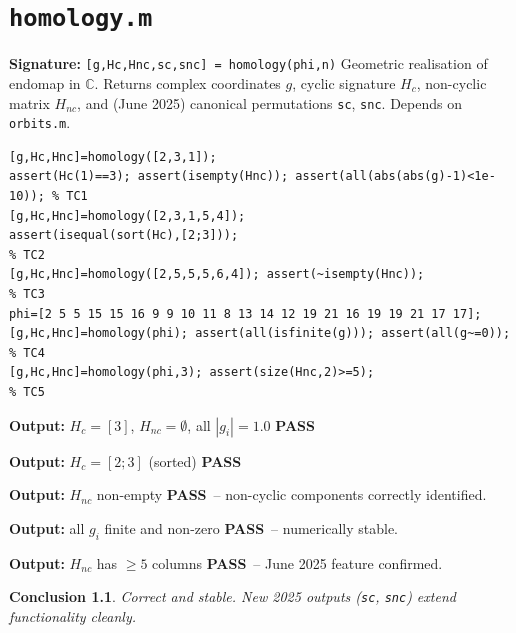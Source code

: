 \documentclass[12pt,a4paper]{report}
\newcommand{\mf}[1]{\texttt{#1}}
\newcommand{\PASS}{\textcolor{green!60!black}{\textbf{PASS}}}
\newtheorem{concl}{Conclusion}[chapter]
\begin{document}
\chapter{\mf{homology.m}}
\begin{tcolorbox}[Abox,title=Analysis]
\textbf{Signature:} \lstinline|[g,Hc,Hnc,sc,snc] = homology(phi,n)|\quad
Geometric realisation of endomap in $\mathbb{C}$. Returns complex coordinates $g$, cyclic signature $H_c$, non-cyclic matrix $H_{nc}$, and (June 2025) canonical permutations \mf{sc}, \mf{snc}. Depends on \mf{orbits.m}.
\end{tcolorbox}
\begin{lstlisting}[caption={Tests for homology.m}]
[g,Hc,Hnc]=homology([2,3,1]);
assert(Hc(1)==3); assert(isempty(Hnc)); assert(all(abs(abs(g)-1)<1e-10)); % TC1
[g,Hc,Hnc]=homology([2,3,1,5,4]);
assert(isequal(sort(Hc),[2;3]));                                           % TC2
[g,Hc,Hnc]=homology([2,5,5,5,6,4]); assert(~isempty(Hnc));               % TC3
phi=[2 5 5 15 15 16 9 9 10 11 8 13 14 12 19 21 16 19 19 21 17 17];
[g,Hc,Hnc]=homology(phi); assert(all(isfinite(g))); assert(all(g~=0));    % TC4
[g,Hc,Hnc]=homology(phi,3); assert(size(Hnc,2)>=5);                      % TC5
\end{lstlisting}
\begin{tcolorbox}[Pbox,title=TC1 -- Pure 3-cycle]
\textbf{Output:} $H_c=[3]$, $H_{nc}=\emptyset$, all $|g_i|=1.0$ \quad \PASS
\end{tcolorbox}
\begin{tcolorbox}[Pbox,title=TC2 -- Two cycles $(1,2,3)$ and $(4,5)$]
\textbf{Output:} $H_c=[2;3]$ (sorted) \quad \PASS
\end{tcolorbox}
\begin{tcolorbox}[Pbox,title=TC3 -- Chain feeding into cycle]
\textbf{Output:} $H_{nc}$ non-empty \quad \PASS\ -- non-cyclic components correctly identified.
\end{tcolorbox}
\begin{tcolorbox}[Pbox,title=TC4 -- 22-element example from header]
\textbf{Output:} all $g_i$ finite and non-zero \quad \PASS\ -- numerically stable.
\end{tcolorbox}
\begin{tcolorbox}[Pbox,title=TC5 -- Extended degree parameter $n=3$]
\textbf{Output:} $H_{nc}$ has $\geq5$ columns \quad \PASS\ -- June 2025 feature confirmed.
\end{tcolorbox}
\begin{concl}
Correct and stable. New 2025 outputs (\mf{sc}, \mf{snc}) extend functionality cleanly.
\end{concl}
\end{document}
